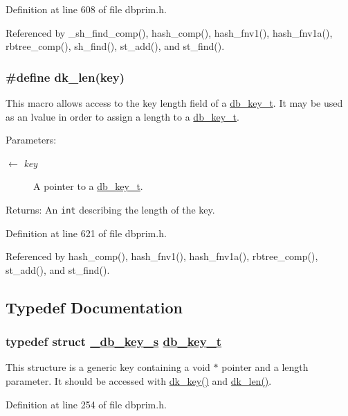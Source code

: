 Definition at line 608 of file dbprim.h.

Referenced by \_\-sh\_\-find\_\-comp(), hash\_\-comp(), hash\_\-fnv1(), hash\_\-fnv1a(), rbtree\_\-comp(), sh\_\-find(), st\_\-add(), and st\_\-find().\hypertarget{group__dbprim_ga3}{
\subsubsection[dk\_\-len]{\setlength{\rightskip}{0pt plus 5cm}\#define dk\_\-len(key)}}
\label{group__dbprim_ga3}


This macro allows access to the key length field of a \hyperlink{group__dbprim_ga0}{db\_\-key\_\-t}. It may be used as an lvalue in order to assign a length to a \hyperlink{group__dbprim_ga0}{db\_\-key\_\-t}.

\begin{Desc}
\item[Parameters:]
\begin{description}
\item[\mbox{$\leftarrow$} {\em key}]A pointer to a \hyperlink{group__dbprim_ga0}{db\_\-key\_\-t}.\end{description}
\end{Desc}
\begin{Desc}
\item[Returns:]An {\tt int} describing the length of the key.\end{Desc}


Definition at line 621 of file dbprim.h.

Referenced by hash\_\-comp(), hash\_\-fnv1(), hash\_\-fnv1a(), rbtree\_\-comp(), st\_\-add(), and st\_\-find().

\subsection{Typedef Documentation}
\hypertarget{group__dbprim_ga0}{
\subsubsection[db\_\-key\_\-t]{\setlength{\rightskip}{0pt plus 5cm}typedef struct \hyperlink{struct__db__key__s}{\_\-db\_\-key\_\-s} \hyperlink{struct__db__key__s}{db\_\-key\_\-t}}}
\label{group__dbprim_ga0}


This structure is a generic key containing a void $\ast$ pointer and a length parameter. It should be accessed with \hyperlink{group__dbprim_ga2}{dk\_\-key()} and \hyperlink{group__dbprim_ga3}{dk\_\-len()}.

Definition at line 254 of file dbprim.h.